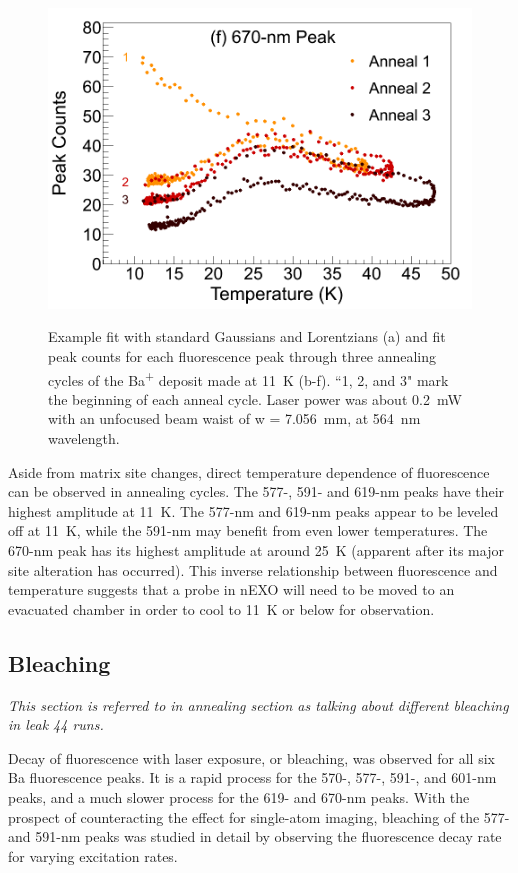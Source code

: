 \begin{figure}
                ~
                \includegraphics[width=.5\textwidth]{figures/anneal_670peak.png}
                \caption{Example fit with standard Gaussians and Lorentzians (a) and fit peak counts for each fluorescence peak through three annealing cycles of the Ba\textsuperscript{+} deposit made at 11~K (b-f).  ``1, 2, and 3" mark the beginning of each anneal cycle.  Laser power was about 0.2~mW with an unfocused beam waist of w = 7.056~mm, at 564~nm wavelength.}
\label{fig:annealGrn}
\end{figure}

Aside from matrix site changes, direct temperature dependence of fluorescence can be observed in annealing cycles.  The 577-, 591- and 619-nm peaks have their highest amplitude at 11~K.  The 577-nm and 619-nm peaks appear to be leveled off at 11~K, while the 591-nm may benefit from even lower temperatures.  The 670-nm peak has its highest amplitude at around 25~K (apparent after its major site alteration has occurred).  This inverse relationship between fluorescence and temperature suggests that a probe in nEXO will need to be moved to an evacuated chamber in order to cool to 11~K or below for observation.  



\subsection{Bleaching}
\label{subsec:bleaching}

\emph{\color{gray}This section is referred to in annealing section as talking about different bleaching in leak 44 runs.}

Decay of fluorescence with laser exposure, or bleaching, was observed for all six Ba fluorescence peaks.  It is a rapid process for the 570-, 577-, 591-, and 601-nm peaks, and a much slower process for the 619- and 670-nm peaks.  With the prospect of counteracting the effect for single-atom imaging, bleaching of the 577- and 591-nm peaks was studied in detail by observing the fluorescence decay rate for varying excitation rates.  

